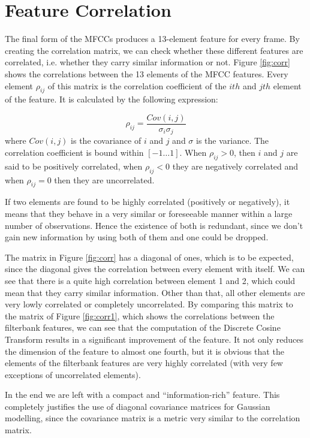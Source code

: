 \documentclass[12pt,a4paper,oneside]{article}
\begin{document}
\section{Feature Correlation}
The final form of the MFCCs produces a 13-element feature for every frame. By creating the correlation matrix, we can check whether these different features are correlated, i.e. whether they carry similar information or not. Figure \ref{fig:corr} shows the correlations between the 13 elements of the MFCC features. Every element $\rho_{ij}$ of this matrix is the correlation coefficient of the $ith$ and $jth$ element of the feature. It is calculated by the following expression:

\begin{equation}
\rho_{ij} = \dfrac{Cov(i, j)}{\sigma_i \sigma_j}
\end{equation}
where $Cov(i, j)$ is the covariance of $i$ and $j$ and $\sigma$ is the variance. The correlation coefficient is bound within $[-1 \dots 1]$. When $\rho_{ij} > 0$, then $i$ and $j$ are said to be positively correlated, when $\rho_{ij} < 0$ they are negatively correlated and when $\rho_{ij} = 0$ then they are uncorrelated.

If two elements are found to be highly correlated (positively or negatively), it means that they behave in a very similar or foreseeable manner within a large number of observations. Hence the existence of both is redundant, since we don't gain new information by using both of them and one could be dropped.

The matrix in Figure \ref{fig:corr} has a diagonal of ones, which is to be expected, since the diagonal gives the correlation between every element with itself. We can see that there is a quite high correlation between element 1 and 2, which could mean that they carry similar information. Other than that, all other elements are very lowly correlated or completely uncorrelated. By comparing this matrix to the matrix of Figure \ref{fig:corr1}, which shows the correlations between the filterbank features, we can see that the computation of the Discrete Cosine Transform results in a significant improvement of the feature. It not only reduces the dimension of the feature to almost one fourth, but it is obvious that the elements of the filterbank features are very highly correlated (with very few exceptions of uncorrelated elements).

In the end we are left with a compact and ``information-rich'' feature. This completely justifies the use of diagonal covariance matrices for Gaussian modelling, since the covariance matrix is a metric very similar to the correlation matrix.
\end{document}
